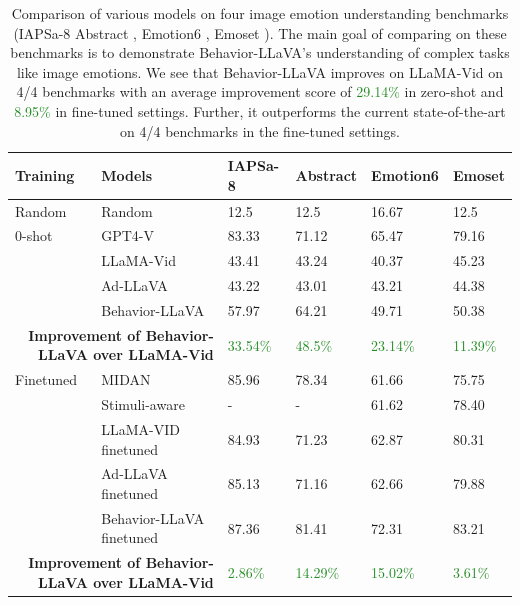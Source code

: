 \begin{table}[]
\begin{adjustbox}{width=\textwidth}
\begin{tabular}{ll|llll}
\toprule[1.2pt]
\textbf{Training} & \textbf{Models}  & \textbf{IAPSa-8}  & \textbf{Abstract} & \textbf{Emotion6}& \textbf{Emoset} \\ \midrule[1.2pt]
Random & Random & 12.5 & 12.5 & 16.67 & 12.5 \\\hline
0-shot & GPT4-V & 83.33 & 71.12 & 65.47 & 79.16 \\
& LLaMA-Vid & 43.41 & 43.24 & 40.37 & 45.23 \\
& Ad-LLaVA & 43.22 & 43.01 & 43.21 & 44.38 \\
& Behavior-LLaVA & 57.97 & 64.21 & 49.71 & 50.38 \\\cline{2-6}
\multicolumn{2}{r|}{\textbf{Improvement of Behavior-LLaVA over LLaMA-Vid}} & \textcolor{ForestGreen}{33.54\%} & \textcolor{ForestGreen}{48.5\%} & \textcolor{ForestGreen}{23.14\%} & \textcolor{ForestGreen}{11.39\%} \\
\hline
Finetuned & MIDAN \cite{xu2022mdan} & 85.96 & 78.34 & 61.66 & 75.75 \\
& Stimuli-aware \cite{yang2021stimuli} & - & - & 61.62 & 78.40 \\
& LLaMA-VID finetuned & 84.93 & 71.23 & 62.87 & 80.31 \\
& Ad-LLaVA finetuned & 85.13 & 71.16 & 62.66 & 79.88 \\
& Behavior-LLaVA finetuned & 87.36 & 81.41 & 72.31 & 83.21 \\\cline{2-6}
\multicolumn{2}{r|}{\textbf{Improvement of Behavior-LLaVA over LLaMA-Vid}} & \textcolor{ForestGreen}{2.86\%} & \textcolor{ForestGreen}{14.29\%} & \textcolor{ForestGreen}{15.02\%} & \textcolor{ForestGreen}{3.61\%} \\
\bottomrule[1.2pt]
\end{tabular}
\end{adjustbox}
\caption{Comparison of various models on four image emotion understanding benchmarks (IAPSa-8 \cite{mikels2005emotional} Abstract \cite{machajdik2010affective}, Emotion6 \cite{peng2015mixed}, Emoset \cite{yang2023emoset}). The main goal of comparing on these benchmarks is to demonstrate Behavior-LLaVA's understanding of complex tasks like image emotions. We see that Behavior-LLaVA improves on LLaMA-Vid on 4/4 benchmarks with an average improvement score of \textcolor{ForestGreen}{29.14\%} in zero-shot and \textcolor{ForestGreen}{8.95\%} in fine-tuned settings. Further, it outperforms the current state-of-the-art on 4/4 benchmarks in the fine-tuned settings.\label{tab:image-emotion}}
\end{table}






